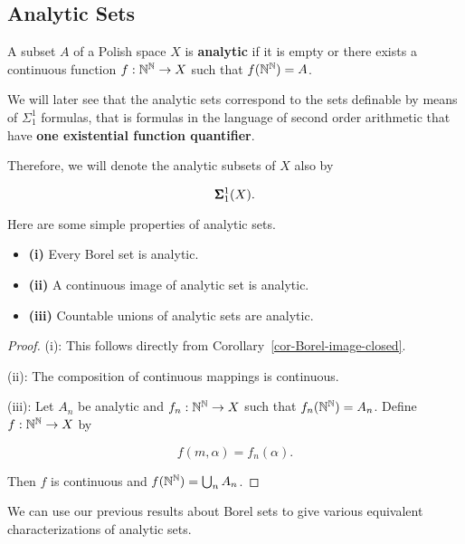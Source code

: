 \subsection{Analytic Sets}

\begin{definition}A subset $A$ of a Polish space $X$ is \textbf{analytic} if it is empty or there exists a continuous function $f:\mathbb{N}^{\mathbb{N}} \to X$ such that $f(\mathbb{N}^{\mathbb{N}}) = A$.

\end{definition}We will later see that the analytic sets correspond to the sets definable by means of $\Sigma^1_1$ formulas, that is formulas in the language of second order arithmetic that have \textbf{one existential function quantifier}.

Therefore, we will denote the analytic subsets of $X$ also by

\begin{equation}
\pmb{\Sigma}^{1}_{1}(X).
\end{equation}

Here are some simple properties of analytic sets.

\begin{proposition}\label{prop-prop-analytic}\begin{itemize}
\item \textbf{(i)} Every Borel set is analytic.
\item \textbf{(ii)} A continuous image of analytic set is analytic.
\item \textbf{(iii)} Countable unions of analytic sets are analytic.
\end{itemize}

\end{proposition}\begin{proof}(i): This follows directly from Corollary~\ref{cor-Borel-image-closed}.

(ii): The composition of continuous mappings is continuous.

(iii): Let $A_n$ be analytic and $f_n:\mathbb{N}^{\mathbb{N}} \to X$ such that $f_n(\mathbb{N}^{\mathbb{N}}) = A_n$. Define $f: \mathbb{N}^{\mathbb{N}} \to X$ by

\begin{equation}
f(m,\alpha) = f_n(\alpha).
\end{equation}

Then $f$ is continuous and $f(\mathbb{N}^{\mathbb{N}}) = \bigcup_n A_n$.

\end{proof}We can use our previous results about Borel sets to give various equivalent characterizations of analytic sets.

